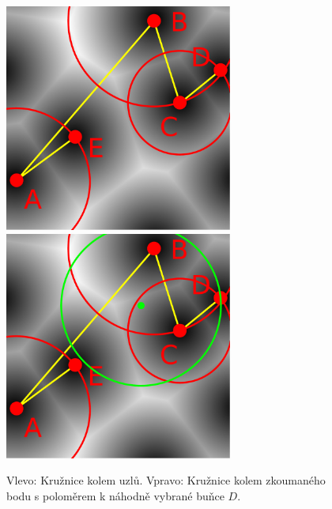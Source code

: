 \begin{figure}[h]
\centering
\includegraphics[width=7.5cm,keepaspectratio]{obr/vorokruh0.pdf}
\includegraphics[width=7.5cm,keepaspectratio]{obr/vorokruh1.pdf}
\caption{Vlevo: Kružnice kolem uzlů. Vpravo: Kružnice kolem zkoumaného bodu s poloměrem k náhodně vybrané buňce $D$.}
\label{fig:vorokruh}
\end{figure}
